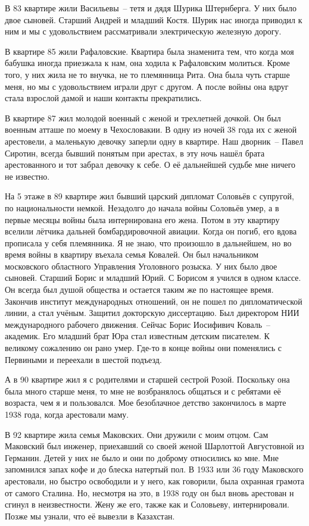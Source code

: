 В 83 квартире жили Васильевы~-- тетя и дядя Шурика Штернберга. У них было двое сыновей. Старший Андрей и младший Костя. Шурик нас иногда приводил к ним и мы с удовольствием рассматривали электрическую железную дорогу.

В квартире 85 жили Рафаловские. Квартира была знаменита тем, что когда моя бабушка иногда приезжала к нам, она ходила к Рафаловским молиться. Кроме того, у них жила не то внучка, не то племянница Рита. Она была чуть старше меня, но мы с удовольствием играли друг с другом. А после войны она вдруг стала взрослой дамой и наши контакты прекратились.

В квартире 87 жил молодой военный с женой и трехлетней дочкой. Он был военным атташе по моему в Чехословакии. В одну иэ ночей 38 года их с женой арестовели, а маленькую девочку заперли одну в квартире. Наш дворник~-- Павел Сиротин, всегда бывший понятым при арестах, в эту ночь нашёл брата арестованного и тот забрал девочку к себе. О её дальнейшей судьбе мне ничего не известно.

На 5 этаже в 89 квартире жил бывший царский дипломат Соловьёв с супругой, по национальности немкой. Незадолго до начала войны Соловьёв умер, а в первые месяцы войны была интернирована его жена. Потом в эту квартиру вселили лётчика дальней бомбардировочной авиации. Когда он погиб, его вдова прописала у себя племянника. Я не знаю, что произошло в дальнейшем, но во время войны в квартиру въехала семья Ковалей. Он был начальником московского областного Управления Уголовного розыска. У них было двое сыновей. Старший Борис и младший Юрий. С Борисом я учился в одном классе. Он всегда был душой общества и остается таким же по настоящее время. Закончив институт международных отношений, он не пошел по дипломатической линии, а стал учёным. Защитил докторскую диссертацию. Был директором НИИ международного рабочего движения. Сейчас Борис Иосифивич Коваль~-- академик. Его младший брат Юра стал известным детским писателем. К великому сожалению он рано умер. Где-то в конце войны они поменялись с Первиными и переехали в шестой подъезд.

А в 90 квартире жил я с родителями и старшей сестрой Розой. Поскольку она была много старше меня, то мне не возбранялось общаться и с ребятами её возраста, чем я и пользовался. Мое безоблачное детство закончилось в марте 1938 года, когда арестовали маму.

В 92 квартире жила семья Маковских. Они дружили с моим отцом. Сам Маковский был инженер, приехавший со своей женой Шарлоттой Августовной из Германин. Детей у них не было и они по доброму относились ко мне. Мне запомнился запах кофе и до блеска натертый пол. В 1933 или 36 году Маковского арестовали, но быстро освободили и у него, как говорили, была охранная грамота от самого Сталина. Но, несмотря на это, в 1938 году он был вновь арестован н сгинул в неизвестности. Жену же его, также как и Соловьеву, интернировали. Позже мы узнали, что её вывезли в Казахстан. 

